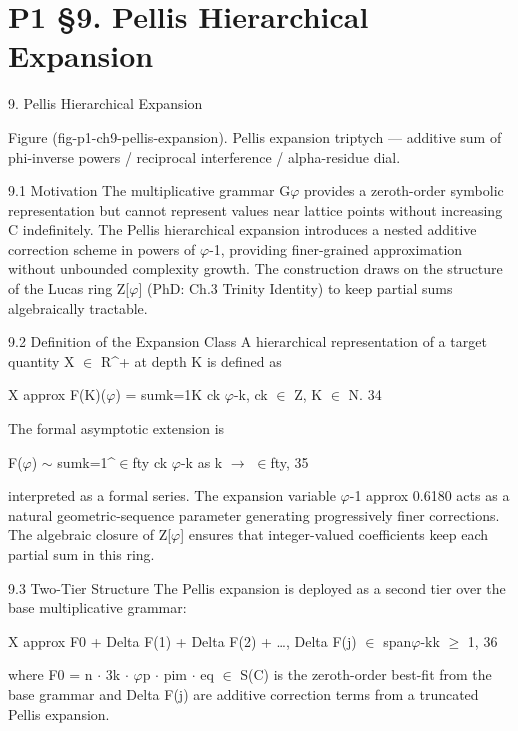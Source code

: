 
\section{P1 §9. Pellis Hierarchical Expansion}

9. Pellis Hierarchical Expansion

        Figure (fig-p1-ch9-pellis-expansion). Pellis expansion triptych --- additive sum of phi-inverse
                            powers / reciprocal interference / alpha-residue dial.

  9.1 Motivation
  The multiplicative grammar G$\varphi$ provides a zeroth-order symbolic representation but
  cannot represent values near lattice points without increasing C indefinitely. The Pellis \citep{pellis2021alpha}
  hierarchical expansion introduces a nested additive correction scheme in powers of $\varphi$-1,
  providing finer-grained approximation without unbounded complexity growth. The
  construction draws on the structure of the Lucas ring Z[$\varphi$] (PhD: Ch.3 Trinity Identity)
  to keep partial sums algebraically tractable.

  9.2 Definition of the Expansion Class
  A hierarchical representation of a target quantity X $\in$ R\textasciicircum{}+ at depth K is defined as

  X approx F(K)($\varphi$) = sumk=1K ck $\varphi$-k, ck $\in$ Z, K $\in$ N. 34

  The formal asymptotic extension is

  F($\varphi$) $\sim$ sumk=1\textasciicircum{}$\in$fty ck $\varphi$-k as k $\rightarrow$ $\in$fty, 35

  interpreted as a formal series. The expansion variable $\varphi$-1 approx 0.6180 acts as a
  natural geometric-sequence parameter generating progressively finer corrections. The
  algebraic closure of Z[$\varphi$] ensures that integer-valued coefficients keep each partial sum
  in this ring.

  9.3 Two-Tier Structure
  The Pellis expansion is deployed as a second tier over the base multiplicative grammar:

  X approx F0 + Delta F(1) + Delta F(2) + …, Delta F(j) $\in$ span{$\varphi$-k}k $\geq$ 1, 36

  where F0 = n $\cdot$ 3k $\cdot$ $\varphi$p $\cdot$ pim $\cdot$ eq $\in$ S(C) is the zeroth-order best-fit from the base
  grammar and Delta F(j) are additive correction terms from a truncated Pellis expansion.

